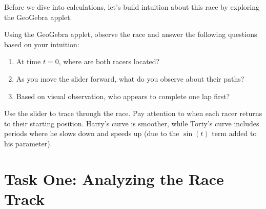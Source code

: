 \documentclass{ximera}
\begin{document}
Before we dive into calculations, let's build intuition about this race by exploring the GeoGebra applet.

\begin{problem}
    Using the GeoGebra applet, observe the race and answer the following questions based on your intuition:
    
    \begin{enumerate}
        \item At time $t=0$, where are both racers located?
        \begin{multipleChoice}
        \end{multipleChoice}
        
        \item As you move the slider forward, what do you observe about their paths?
        \begin{selectAll}
        \end{selectAll}
        
        \item Based on visual observation, who appears to complete one lap first?
        \begin{multipleChoice}
        \end{multipleChoice}
    \end{enumerate}
    
    \begin{feedback}
        Use the slider to trace through the race. Pay attention to when each racer returns to their starting position. Harry's curve is smoother, while Torty's curve includes periods where he slows down and speeds up (due to the $\sin(t)$ term added to his parameter).
    \end{feedback}
\end{problem}

\section{Task One: Analyzing the Race Track}
\end{document}
